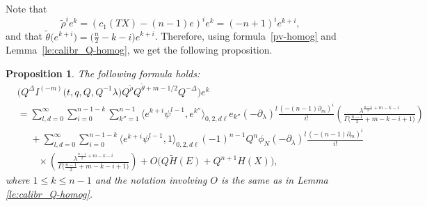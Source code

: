 \documentclass[pdftex]{sigma}
\numberwithin{equation}{section}
\newtheorem{Proposition}[Theorem]{Proposition}
\begin{document}
Note that
\[
\widetilde{\rho}^i e^k = (c_1(TX)-(n-1) e)^i e^k = (-n+1)^i e^{k+i},
\]
and that
$\widetilde{\theta}\big(e^{k+i}\big) = \big(\tfrac{n}{2}-k-i\big)
e^{k+i}$. Therefore, using formula~\eqref{pv-homog} and Lemma~\ref{le:calibr_Q-homog}, we get the following proposition.
\begin{Proposition}\label{prop:Q-exp_e}
The following formula holds:
\begin{align*}
&
\big( Q^\Delta
I^{(-m)}\big(t,q,Q, Q^{-1}\lambda\big)
Q^{\widetilde{\rho}} Q^{\widetilde{\theta}+m-1/2}
Q^{-\Delta} \big) e^k \\
&=
\sum_{l,d=0}^\infty\!
\sum_{i=0}^{n-1-k}\!
\sum_{k''=1}^{n-1}\!
\big\langle
e^{k+i} \psi^{l-1}, e^{k''}\big\rangle_{0,2,d\ell} e_{k''}
(-\partial_\lambda)^l \frac{(-(n-1)\partial_m)^i}{i!}\!
\left(
\frac{ \lambda^{\frac{n-1}{2}+ m-k-i} }{
\Gamma\big(\frac{n-1}{2}+ m-k-i+1\big) }
\right) \\
&\phantom{=}{}+
\sum_{l,d=0}^\infty
\sum_{i=0}^{n-1-k}
\big\langle
e^{k+i} \psi^{l-1}, 1\big\rangle_{0,2,d\ell} (-1)^{n-1}Q^n \phi_N
(-\partial_\lambda)^l \frac{(-(n-1)\partial_m)^i}{i!}
\\
&\phantom{=+}{}\times\left(
\frac{ \lambda^{\frac{n-1}{2}+ m-k-i} }{
\Gamma\big(\frac{n-1}{2}+ m-k-i+1\big) }
\right) +O\big(Q\widetilde{H}(E)+Q^{n+1}H(X)\big),
\end{align*}
where $1\leq k\leq n-1$ and the notation involving $O$ is the same as in Lemma {\rm\ref{le:calibr_Q-homog}}.
\end{Proposition}
\end{document}
